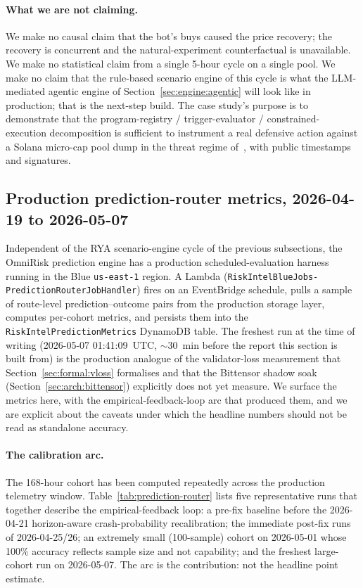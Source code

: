 \documentclass[11pt,a4paper]{article}
\begin{document}
\paragraph{What we are not claiming.} We make no causal claim that the bot's buys
caused the price recovery; the recovery is concurrent and the natural-experiment
counterfactual is unavailable. We make no statistical claim from a single 5-hour
cycle on a single pool. We make no claim that the rule-based scenario engine of
this cycle is what the LLM-mediated agentic engine of Section~\ref{sec:engine:agentic}
will look like in production; that is the next-step build. The case study's
purpose is to demonstrate that the program-registry / trigger-evaluator /
constrained-execution decomposition is sufficient to instrument a real defensive
action against a Solana micro-cap pool dump in the threat regime
of~\cite{cernera2023token}, with public timestamps and signatures.

\subsection{Production prediction-router metrics, 2026-04-19 to 2026-05-07}\label{sec:case-study:prediction-router}

Independent of the RYA scenario-engine cycle of the previous subsections, the
OmniRisk prediction engine has a production scheduled-evaluation harness running
in the Blue \texttt{us-east-1} region. A Lambda
(\texttt{RiskIntelBlueJobs-PredictionRouterJobHandler}) fires on an EventBridge
schedule, pulls a sample of route-level prediction--outcome pairs from the
production storage layer, computes per-cohort metrics, and persists them into
the \texttt{RiskIntelPredictionMetrics} DynamoDB table. The freshest run at the
time of writing (2026-05-07 01:41:09~UTC, $\sim$30~min before the report this
section is built from) is the production analogue of the validator-loss
measurement that Section~\ref{sec:formal:vloss} formalises and that the
Bittensor shadow soak (Section~\ref{sec:arch:bittensor}) explicitly does not
yet measure. We surface the metrics here, with the empirical-feedback-loop arc
that produced them, and we are explicit about the caveats under which the
headline numbers should not be read as standalone accuracy.

\paragraph{The calibration arc.} The 168-hour cohort has been computed
repeatedly across the production telemetry window. Table~\ref{tab:prediction-router}
lists five representative runs that together describe the empirical-feedback
loop: a pre-fix baseline before the 2026-04-21 horizon-aware crash-probability
recalibration; the immediate post-fix runs of 2026-04-25/26; an extremely small
(100-sample) cohort on 2026-05-01 whose 100\% accuracy reflects sample size and
not capability; and the freshest large-cohort run on 2026-05-07. The arc is
the contribution: not the headline point estimate.
\end{document}
